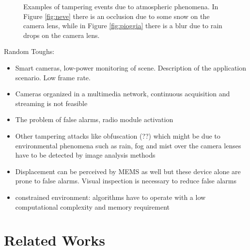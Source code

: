 \documentclass{llncs}
\begin{document}
\begin{figure}
\centering
{}
\caption[Tampering examples]{Examples of tampering events due to atmospheric phenomena. In Figure \ref{fig:neve} there is an occlusion due to some snow on the camera lens, while in Figure \ref{fig:pioggia} there is a blur due to rain drops on the camera lens.}
\label{fig:tampering}
\end{figure}


Random Toughs:
\begin{itemize}
\item Smart cameras, low-power monitoring of scene. Description of the application scenario. Low frame rate.
\item Cameras organized in a multimedia network, continuous acquisition and streaming is not feasible
\item The problem of false alarms, radio module activation
\item Other tampering attacks like obfuscation (??) which might be due to environmental phenomena such as rain, fog and mist over the camera lenses have to be detected by image analysis methods
\item Displacement can be perceived by MEMS as well but these device alone are prone to false alarms. Visual inspection is necessary to reduce false alarms
\item constrained environment: algorithms have to operate with a low computational complexity and memory requirement
\end{itemize}

 
\section{Related Works}\label{sec:relWorks}
\end{document}
